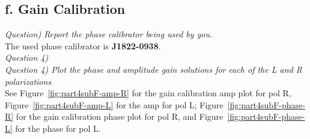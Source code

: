 \documentclass[12pt, a4paper]{article}
\begin{document}


\subsection{f. Gain Calibration}
\noindent \textit{Question) Report the phase calibrator being used by you.} \\
The used phase calibrator is \textbf{J1822-0938}. \\


% 
% 
% 
\noindent \textit{Question 4) } \\
% 
% 
% 
% 
% 
\noindent \textit{Question 4) Plot the phase and amplitude gain solutions for each of the L and R polarizations} \\
See Figure~\ref{fig:part4subF-amp-R} for the gain calibration amp plot for pol R, Figure~\ref{fig:part4subF-amp-L} for the amp for pol L; Figure~\ref{fig:part4subF-phase-R} for the gain calibration phase plot for pol R, and Figure~\ref{fig:part4subF-phase-L} for the phase for pol L.
\end{document}
